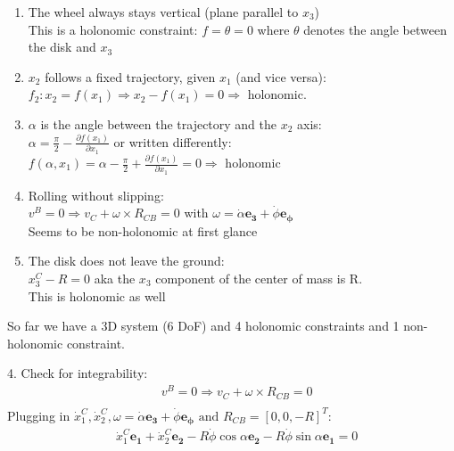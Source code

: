 \begin{enumerate}
    \item The wheel always stays vertical (plane parallel to $x_3$)\\
        This is a holonomic constraint: $f = \theta = 0$ where $\theta$ denotes the angle between the disk and $x_3$
    \item $x_2$ follows a fixed trajectory, given $x_1$ (and vice versa):\\
        $f_2: x_2 = f(x_1) \Rightarrow x_2 - f(x_1) = 0 \Rightarrow$ holonomic.
    \item $\alpha$ is the angle between the trajectory and the $x_2$ axis:\\
        $\alpha = \frac{\pi}2 - \frac{\partial f(x_1)}{\partial x_1}$ or written differently:\\
             $f(\alpha, x_1) = \alpha - \frac{\pi}2 + \frac{\partial f(x_1)}{\partial x_1} = 0 \Rightarrow$ holonomic
    \item Rolling without slipping:\\
        $v^B = 0 \Rightarrow v_C + \omega \times R_{CB} = 0$ with $\omega = \dot{\alpha}\boldsymbol{e_3} + \dot\phi\boldsymbol{e_\phi}$\\
        Seems to be non-holonomic at first glance
    \item The disk does not leave the ground:\\
        $x_3^C - R = 0$ aka the $x_3$ component of the center of mass is R.\\
        This is holonomic as well
\end{enumerate}

\noindent So far we have a 3D system (6 DoF) and 4 holonomic constraints and 1 non-holonomic constraint.\vspace{1cm}

4. Check for integrability:
\begin{equation}
    \begin{split}
        &v^B = 0 \Rightarrow v_C + \omega \times R_{CB} = 0\\
    \end{split}
\end{equation}
Plugging in $\dot{x}_1^C, \dot{x}_2^C, \omega = \dot{\alpha}\boldsymbol{e_3} + \dot\phi\boldsymbol{e_\phi} \text{ and } R_{CB} = [0,0,-R]^T$:
\begin{equation}
    \begin{split}
        &\dot x_1^C\boldsymbol{e_1} + \dot x_2^C\boldsymbol{e_2} -  R\dot\phi\cos\alpha\boldsymbol{e_2} - R\dot\phi\sin\alpha\boldsymbol{e_1} = 0
    \end{split}
\end{equation}

